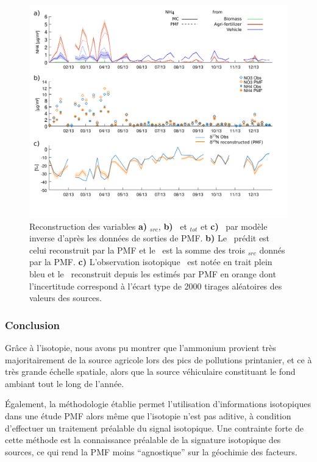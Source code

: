 \begin{figure}[ht]
    \centering
    \includegraphics[width=1.0\textwidth]{figures/INACS/PMF_OPE_reconstruction.pdf}
    \caption{Reconstruction des variables \textbf{a)} \NHq$_{src}$, \textbf{b)} \NOt~et
        \NHq$_{tot}$ et \textbf{c)} \dN~par modèle inverse d'après les données de sorties
        de PMF.
        \textbf{b)} Le \NOt~prédit est celui reconstruit par la PMF et le \NHq~est la
        somme des trois \NHq$_{src}$ donnés par la PMF.
        \textbf{c)} L'observation isotopique \dN~est notée en trait plein bleu et le
        \dN~reconstruit depuis les \NHq estimés par PMF en orange dont l'incertitude
        correspond à l'écart type de 2000 tirages aléatoires des valeurs des sources.
    }
    \label{fig:PMFreconstruct}
\end{figure}

\subsubsection{Conclusion}%
\label{ssub:conclusion}


Grâce à l'isotopie, nous avons pu montrer que l'ammonium provient très majoritairement
de la source agricole lors des pics de pollutions printanier, et ce à très grande échelle
spatiale, alors que la source véhiculaire constituant le fond ambiant tout le long de
l'année.

Également, la méthodologie établie permet l'utilisation d'informations isotopiques dans
une étude PMF alors même que l'isotopie n'est pas aditive, à condition d'effectuer un
traitement préalable du signal isotopique. Une contrainte forte de cette méthode est la
connaissance préalable de la signature isotopique des sources, ce qui rend la PMF moins
``agnostique'' sur la géochimie des facteurs.

